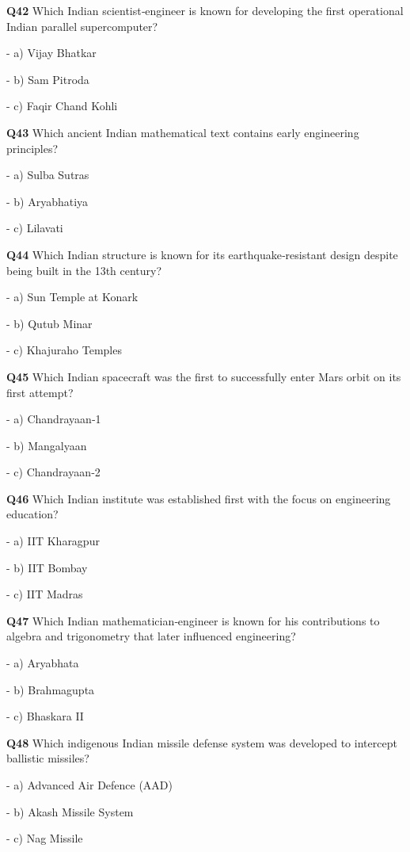 \textbf{Q42} Which Indian scientist‑engineer is known for developing the first operational Indian parallel supercomputer?\par
\quad - a) Vijay Bhatkar\par
\quad - b) Sam Pitroda\par
\quad - c) Faqir Chand Kohli\par

\textbf{Q43} Which ancient Indian mathematical text contains early engineering principles?\par
\quad - a) Sulba Sutras\par
\quad - b) Aryabhatiya\par
\quad - c) Lilavati\par

\textbf{Q44} Which Indian structure is known for its earthquake‑resistant design despite being built in the 13th century?\par
\quad - a) Sun Temple at Konark\par
\quad - b) Qutub Minar\par
\quad - c) Khajuraho Temples\par

\textbf{Q45} Which Indian spacecraft was the first to successfully enter Mars orbit on its first attempt?\par
\quad - a) Chandrayaan‑1\par
\quad - b) Mangalyaan\par
\quad - c) Chandrayaan‑2\par

\textbf{Q46} Which Indian institute was established first with the focus on engineering education?\par
\quad - a) IIT Kharagpur\par
\quad - b) IIT Bombay\par
\quad - c) IIT Madras\par

\textbf{Q47} Which Indian mathematician‑engineer is known for his contributions to algebra and trigonometry that later influenced engineering?\par
\quad - a) Aryabhata\par
\quad - b) Brahmagupta\par
\quad - c) Bhaskara II\par

\textbf{Q48} Which indigenous Indian missile defense system was developed to intercept ballistic missiles?\par
\quad - a) Advanced Air Defence (AAD)\par
\quad - b) Akash Missile System\par
\quad - c) Nag Missile\par

